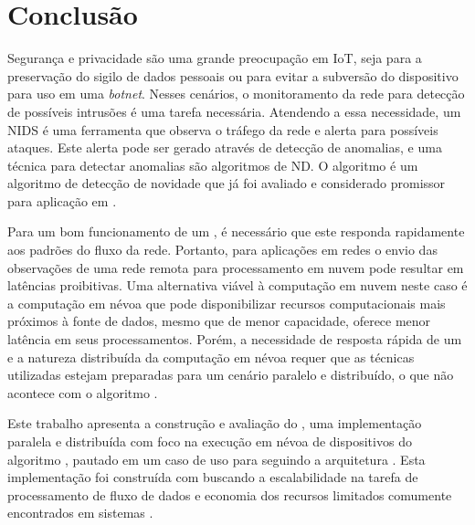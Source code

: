 
\chapter{Conclusão}\label{cha:final}


Segurança e privacidade são uma grande preocupação em \acf{IoT}, seja para a
preservação do sigilo de dados pessoais ou para evitar a subversão do
dispositivo para uso em uma \emph{botnet}. Nesses  cenários,
o monitoramento da rede para detecção
de possíveis intrusões é uma tarefa necessária.
Atendendo a essa necessidade, um \acf{NIDS} é uma ferramenta que observa o
tráfego da rede e alerta para possíveis ataques.
Este alerta pode ser gerado através de detecção de anomalias, e uma técnica para
detectar anomalias são algoritmos de \acf{ND}. O algoritmo \minas é um
algoritmo de detecção de novidade que já foi avaliado e considerado promissor para aplicação em \nids.

Para um bom funcionamento de um \nids, é necessário que este responda rapidamente
aos padrões do fluxo da rede. Portanto, para aplicações em redes \iot o envio das
observações de uma rede remota para processamento em nuvem pode resultar em latências proibitivas. 
Uma alternativa viável à computação em nuvem neste caso é a computação em névoa
que pode disponibilizar recursos computacionais mais próximos
à fonte de dados, mesmo que de menor capacidade, oferece menor latência em seus processamentos.
Porém, a necessidade de resposta rápida de um \nids e a natureza distribuída da
computação em névoa requer que as técnicas utilizadas estejam preparadas para
um cenário paralelo e distribuído, o que não acontece com o algoritmo \minas.

Este trabalho apresenta a construção e avaliação do \mfog, uma implementação
paralela e distribuída com foco na execução em névoa de dispositivos \iot do
algoritmo \minas, pautado em um caso de uso para \nids seguindo a arquitetura \arch \cite{Cassales2019}.
Esta implementação foi construída com \mpi buscando a escalabilidade na tarefa de
processamento de fluxo de dados e economia dos recursos limitados comumente
encontrados em sistemas \iot.


